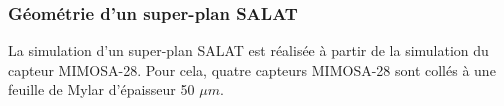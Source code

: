 %    
%    
%    
%    
%     
% 
%    
   
   \subsubsection{G\'eom\'etrie d'un super-plan SALAT}
   
   La simulation d'un super-plan SALAT est r\'ealis\'ee \`a partir de la simulation du capteur MIMOSA-28. Pour cela, quatre capteurs MIMOSA-28 sont coll\'es \`a une feuille de Mylar d'\'epaisseur 50 $\mu m$. 
   
